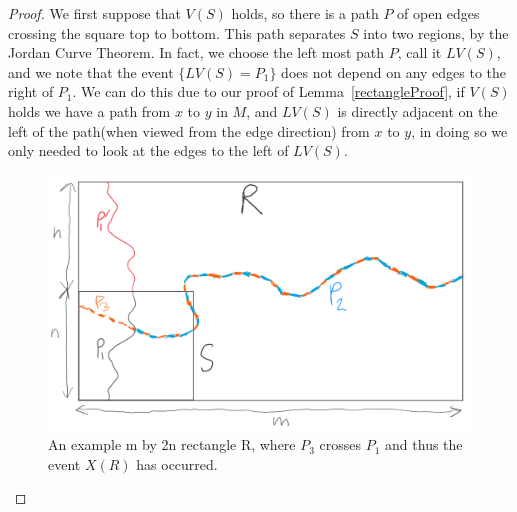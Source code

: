 \documentclass[a4paper,11pt]{article}
\theoremstyle{definition}
\begin{document}
\begin{proof}
	We first suppose that $V(S)$ holds, so there is a path $P$ of open edges crossing the square top to bottom. This path separates $S$ into two regions, by the Jordan Curve Theorem. In fact, we choose the left most path $P$, call it $LV(S)$, and we note that the event $\{LV(S) = P_1\}$ does not depend on any edges to the right of $P_1$. We can do this due to our proof of Lemma~\ref{rectangleProof}, if $V(S)$ holds we have a path from $x$ to $y$ in $M$, and $LV(S)$ is directly adjacent on the left of the path(when viewed from the edge direction) from $x$ to $y$, in doing so we only needed to look at the edges to the left of $LV(S)$.

	\begin{figure}
		\centering
		\includegraphics[scale=0.48]{drawings/2nbymRectangle.png}
		\caption{An example m by 2n rectangle R, where $P_3$ crosses $P_1$ and thus the event $X(R)$ has occurred.}
		\label{fig:2nbymProof}
	\end{figure}


\end{proof}
\end{document}
